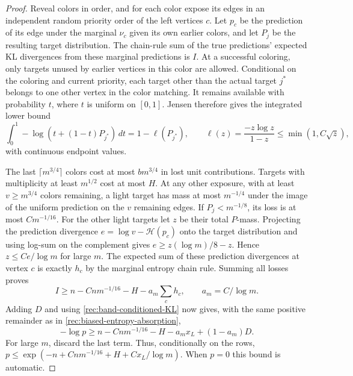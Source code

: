 \begin{proof}
Reveal colors in order, and for each color expose its edges in an
independent random priority order of the left vertices $c$.
Let $p_c$ be the prediction of its edge under the marginal $\nu_c$
given its own earlier colors, and let $P_j$ be the resulting target
distribution.  The chain-rule sum of the true predictions' expected
KL divergences from these marginal predictions is $I$.
At a successful coloring, only targets unused by earlier vertices
in this color are allowed.  Conditional on the coloring and current
priority, each target other than the actual target $j^*$ belongs to
one other vertex in the color matching.  It remains available with
probability $t$, where $t$ is uniform on $[0,1]$.  Jensen therefore
gives the integrated lower bound
\[
 \int_0^1-\log(t+(1-t)P_{j^*})\,dt
 =1-\ell(P_{j^*}),\qquad
 \ell(z)=\frac{-z\log z}{1-z}\le\min(1,C\sqrt z),
\]
with continuous endpoint values.

The last $\lceil m^{3/4}\rceil$ colors cost at most $bm^{3/4}$
in lost unit contributions.  Targets with multiplicity at least
$m^{1/2}$ cost at most $H$.  At any other exposure, with at least
$v\ge m^{3/4}$ colors remaining, a light target has mass at most
$m^{-1/4}$ under the image of the uniform prediction on the $v$
remaining edges.  If $P_j<m^{-1/8}$, its loss is at most
$Cm^{-1/16}$.  For the other light targets let $z$ be their total
$P$-mass.  Projecting the prediction divergence
$e=\log v-\mathcal H(p_c)$ onto the target distribution and using
log-sum on the complement gives
$e\ge z(\log m)/8-z$.  Hence $z\le Ce/\log m$ for large $m$.
The expected sum of these prediction divergences at vertex $c$ is
exactly $h_c$ by the marginal entropy chain rule.
Summing all losses proves
\begin{equation}\label{rec:band-total-correlation}
 I\ge n-Cn m^{-1/16}-H-a_m\sum_ch_c,\qquad
 a_m=C/\log m.
\end{equation}
Adding $D$ and using \eqref{rec:band-conditioned-KL} now gives,
with the same positive remainder as in
\eqref{rec:biased-entropy-absorption},
\begin{equation}\label{rec:band-entropy-absorption}
 -\log p\ge n-Cn m^{-1/16}-H-a_m x_L+(1-a_m)D.
\end{equation}
For large $m$, discard the last term.  Thus, conditionally on the
rows, $p\le\exp(-n+Cn m^{-1/16}+H+Cx_L/\log m)$.
When $p=0$ this bound is automatic.


\end{proof}
